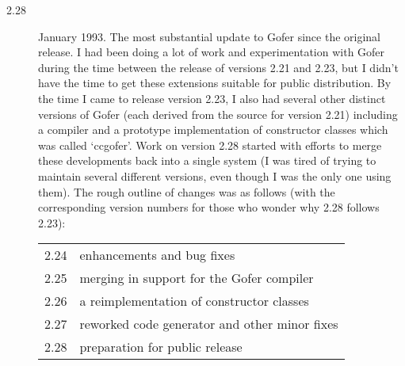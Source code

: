 \begin{description}
   \item[2.28]  January 1993.  The most substantial update to Gofer since
	 the original release.  I had been doing a lot of work and
	 experimentation with Gofer during the time between the
	 release of versions 2.21 and 2.23, but I didn't have the
	 time to get these extensions suitable for public distribution.
	 By the time I came to release version 2.23, I also had
	 several other distinct versions of Gofer (each derived
	 from the source for version 2.21) including a compiler
	 and a prototype implementation of constructor classes
	 which was called `ccgofer'.   Work on version 2.28 started
	 with efforts to merge these developments back into a single
	 system (I was tired of trying to maintain several different
	 versions, even though I was the only one using them).
	 The rough outline of changes was as follows (with the
	 corresponding version numbers for those who wonder why
	 2.28 follows 2.23):

\begin{tabular}{ll}
            2.24 & enhancements and bug fixes \\
            2.25 & merging in support for the Gofer compiler \\
            2.26 & a reimplementation of constructor classes \\
            2.27 & reworked code generator and other minor fixes \\
            2.28 & preparation for public release
\end{tabular}
\end{description}


